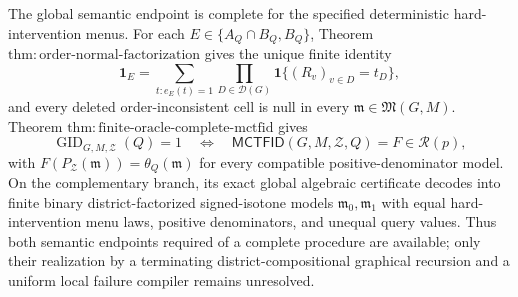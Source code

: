 The global semantic endpoint is complete for the specified deterministic hard-intervention menus.  For each \(E\in\{A_Q\cap B_Q,B_Q\}\), Theorem \(\mathrm{thm:order\text{-}normal\text{-}factorization}\) gives the unique finite identity
\[
 \mathbf 1_E
 =\sum_{t:e_E(t)=1}\prod_{D\in\mathcal D(G)}
   \mathbf 1\{(R_v)_{v\in D}=t_D\},
\]
and every deleted order-inconsistent cell is null in every \(\mathfrak m\in\mathfrak M(G,M)\).  Theorem \(\mathrm{thm:finite\text{-}oracle\text{-}complete\text{-}mctfid}\) gives
\[
 \operatorname{GID}_{G,M,\mathcal Z}(Q)=1
 \quad\Longleftrightarrow\quad
 \mathsf{MCTFID}(G,M,\mathcal Z,Q)=F\in\mathcal R(p),
\]
with \(F(P_{\mathcal Z}(\mathfrak m))=\theta_Q(\mathfrak m)\) for every compatible positive-denominator model.  On the complementary branch, its exact global algebraic certificate decodes into finite binary district-factorized signed-isotone models \(\mathfrak m_0,\mathfrak m_1\) with equal hard-intervention menu laws, positive denominators, and unequal query values.  Thus both semantic endpoints required of a complete procedure are available; only their realization by a terminating district-compositional graphical recursion and a uniform local failure compiler remains unresolved.